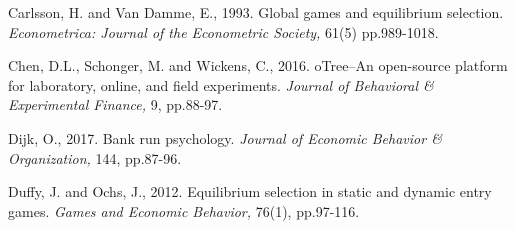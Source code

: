 \documentclass[12pt, letterpaper]{article}
\theoremstyle{plain}
\begin{document}
\begin{thebibliography}{10}
\bibitem{} Carlsson, H. and Van Damme, E., 1993. Global games and equilibrium selection. \textit{Econometrica: Journal of the Econometric Society,} 61(5) pp.989-1018.


 Chen, D.L., Schonger, M. and Wickens, C., 2016. oTree--An open-source platform for laboratory, online, and field experiments. \textit{Journal of Behavioral \& Experimental Finance,} 9, pp.88-97.






 Dijk, O., 2017. Bank run psychology. \textit{Journal of Economic Behavior \& Organization,} 144, pp.87-96.


\bibitem{} Duffy, J. and Ochs, J., 2012. Equilibrium selection in static and dynamic entry games. \textit{Games and Economic Behavior,} 76(1), pp.97-116.




\end{thebibliography}
\end{document}
